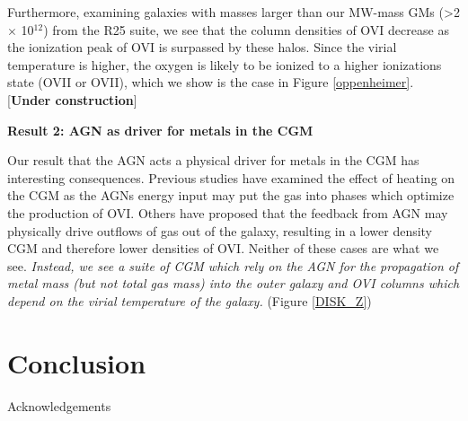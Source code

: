 \documentclass[]{emulateapj}
\begin{document}
Furthermore, examining galaxies with masses larger than our MW-mass GMs (\textgreater 2 $\times$ 10$^{12}$) from the R25 suite, we see that the column densities of OVI decrease as the ionization peak of OVI is surpassed by these halos. Since the virial temperature is higher, the oxygen is likely to be ionized to a higher ionizations state (OVII or OVII), which we show is the case in Figure \ref{oppenheimer}. [\textbf{Under construction}]

\textbf{Result 2: AGN as driver for metals in the CGM}

Our result that the AGN acts a physical driver for metals in the CGM has interesting consequences. Previous studies have examined the effect of heating on the CGM as the AGNs energy input may put the gas into phases which optimize the production of OVI. \citep{Suresh2017} Others have proposed that the feedback from AGN may physically drive outflows of gas out of the galaxy, resulting in a lower density CGM and therefore lower densities of OVI. Neither of these cases are what we see. \textit{Instead, we see a suite of CGM which rely on the AGN for the propagation of metal mass (but not total gas mass) into the outer galaxy and OVI columns which depend on the virial temperature of the galaxy.} (Figure \ref{DISK_Z})






\section{Conclusion}





\acknowledgments
Acknowledgements


\end{document}

